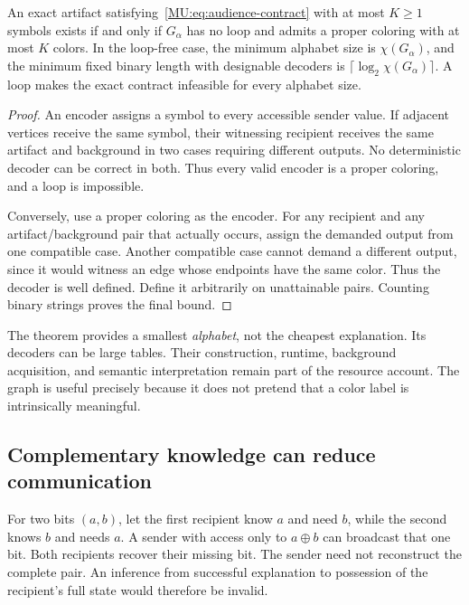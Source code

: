 \begin{MUtheorem}\label{MU:thm:audience}
An exact artifact satisfying~\eqref{MU:eq:audience-contract} with at most $K\geq1$ symbols exists if and only if $G_\alpha$ has no loop and admits a proper coloring with at most $K$ colors. In the loop-free case, the minimum alphabet size is $\chi(G_\alpha)$, and the minimum fixed binary length with designable decoders is $\lceil\log_2\chi(G_\alpha)\rceil$. A loop makes the exact contract infeasible for every alphabet size.
\end{MUtheorem}
\begin{proof}
An encoder assigns a symbol to every accessible sender value. If adjacent vertices receive the same symbol, their witnessing recipient receives the same artifact and background in two cases requiring different outputs. No deterministic decoder can be correct in both. Thus every valid encoder is a proper coloring, and a loop is impossible.

Conversely, use a proper coloring as the encoder. For any recipient and any artifact/background pair that actually occurs, assign the demanded output from one compatible case. Another compatible case cannot demand a different output, since it would witness an edge whose endpoints have the same color. Thus the decoder is well defined. Define it arbitrarily on unattainable pairs. Counting binary strings proves the final bound.
\end{proof}

The theorem provides a smallest \emph{alphabet}, not the cheapest explanation. Its decoders can be large tables. Their construction, runtime, background acquisition, and semantic interpretation remain part of the resource account. The graph is useful precisely because it does not pretend that a color label is intrinsically meaningful.

\subsection{Complementary knowledge can reduce communication}
For two bits $(a,b)$, let the first recipient know $a$ and need $b$, while the second knows $b$ and needs $a$. A sender with access only to $a\oplus b$ can broadcast that one bit. Both recipients recover their missing bit. The sender need not reconstruct the complete pair. An inference from successful explanation to possession of the recipient's full state would therefore be invalid.

